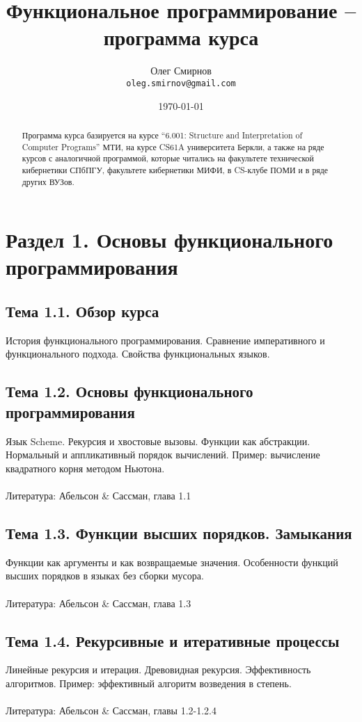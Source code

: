 \documentclass[a4paper,10pt]{article}
\author{Олег Смирнов \\
\texttt{oleg.smirnov@gmail.com}}
\date{\today}
\title{Функциональное программирование -- программа курса}
\begin{document}
\maketitle

\begin{abstract}
Программа курса базируется на курсе ``6.001: Structure and Interpretation of 
Computer Programs'' МТИ, на курсе CS61A университета Беркли, а также на ряде
курсов с аналогичной программой, которые читались на факультете технической
кибернетики СПбПГУ, факультете кибернетики МИФИ, в CS-клубе ПОМИ и в ряде
других ВУЗов.
\end{abstract}

\section*{Раздел 1. Основы функционального программирования}

\subsection*{Тема 1.1. Обзор курса}
История функционального программирования. Сравнение императивного и
функционального подхода. Свойства функциональных языков.

\subsection*{Тема 1.2. Основы функционального программирования}
Язык Scheme. Рекурсия и хвостовые вызовы. Функции как абстракции. 
Нормальный и аппликативный порядок вычислений. Пример: вычисление 
квадратного корня методом Ньютона. 
\\\\
Литература: Абельсон \& Сассман, глава 1.1

\subsection*{Тема 1.3. Функции высших порядков. Замыкания}
Функции как аргументы и как возвращаемые значения. Особенности функций
высших порядков в языках без сборки мусора.
\\\\
Литература: Абельсон \& Сассман, глава 1.3

\subsection*{Тема 1.4. Рекурсивные и итеративные процессы}
Линейные рекурсия и итерация. Древовидная рекурсия. Эффективность алгоритмов.
Пример: эффективный алгоритм возведения в степень.
\\\\
Литература: Абельсон \& Сассман, главы 1.2-1.2.4
\end{document}
